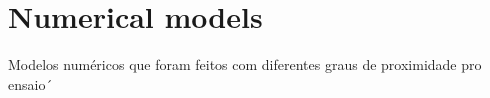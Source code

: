 \section{Numerical models} \label{sec:numerical_models}
Modelos numéricos que foram feitos com diferentes graus de proximidade pro ensaio´
